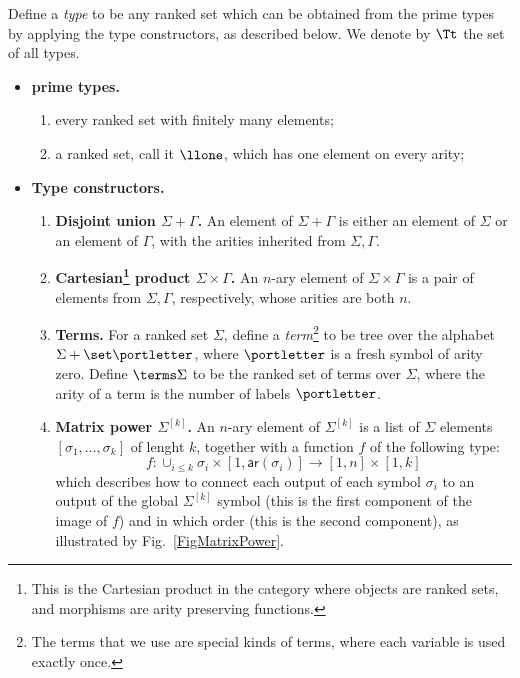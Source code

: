 \begin{definition}[Types]\label{def:types}
    Define a \emph{type} to be any ranked set which can be obtained from the prime types by applying the type constructors, as described below. We denote by $\Tt$ the set of all types. 
    \begin{itemize}
        \item {\bf prime types.} 
           \begin{enumerate}
            \item every ranked set with finitely many elements;
            \item a ranked set, call it  $\llone$, which has one element on every arity;
        \end{enumerate}
    \item {\bf Type constructors.} 
     \begin{enumerate}
        \item {\bf Disjoint union $\Sigma+\Gamma$.} An element of $\Sigma+\Gamma$ is either an element of $\Sigma$ or an element of $\Gamma$, with the arities inherited from $\Sigma,\Gamma$. 
        \item {\bf Cartesian\footnote{This is the Cartesian product in the category where objects are ranked sets, and morphisms are arity preserving functions.}  product $\Sigma \times \Gamma$.} An  $n$-ary element of $\Sigma \times \Gamma$ is a pair of elements from $\Sigma, \Gamma$, respectively, whose arities are both $n$.
        \item {\bf Terms.} For a ranked set  $\Sigma$, define a \emph{term}\footnote{The terms that we use are special kinds of terms, where each variable is used exactly once.} to be tree over the alphabet $\Sigma + \set \portletter$, where $\portletter$ is a fresh symbol of arity zero. Define $\terms \Sigma$ to be the ranked set of terms over $\Sigma$, where the arity of a term is the number of labels $\portletter$.
\item {\bf Matrix power $\Sigma^{[k]}$.} An $n$-ary element of $\Sigma^{[k]}$ is a list of $\Sigma$ elements $[\sigma_1,\dots,\sigma_k]$ of lenght $k$, together with a function $f$ of the following type:
\[f: \cup_{i\leq k} \sigma_i\times [1, \mathsf{ar}(\sigma_i)]\to [1,n]\times [1,k]\]
which describes how to connect each output of each symbol $\sigma_i$ to an output of the global $\Sigma^{[k]}$ symbol (this is the first component of the image of $f$) and in which order (this is the second component), as illustrated by Fig.~\ref{FigMatrixPower}.


\end{enumerate}
\end{itemize}
\end{definition}
